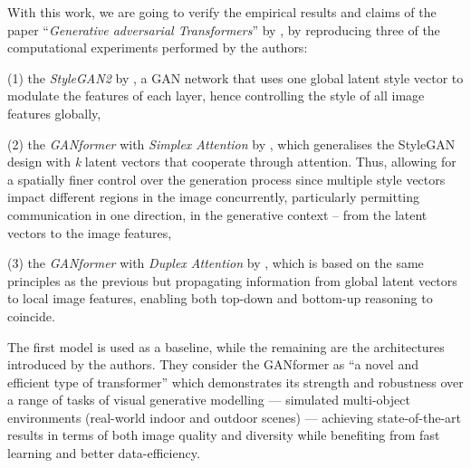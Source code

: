 \documentclass{article}
\begin{document}
With this work, we are going to verify the empirical results and claims of the paper 
``\emph{Generative adversarial Transformers}'' by \citet{hudson2021generative}, by reproducing 
three of the computational experiments performed by the authors:
\begin{enumerate*}
	\item[(1)] the \textit{StyleGAN2} by \citet{karras2020analyzing,karras2019style}, a GAN 
	network that uses one global latent style vector to modulate the features of each layer, hence 
	controlling the style of all image features globally,
	\item[(2)] the \textit{GANformer} with \textit{Simplex Attention} by 
	\citet{hudson2021generative}, which generalises the StyleGAN design with \textit{k} latent 
	vectors that cooperate through attention. Thus, allowing for a spatially finer control over the 
	generation 
	process since multiple style vectors impact different regions in the image concurrently, 
	particularly 
	permitting communication in one direction, in the generative context – from the latent vectors to 
	the 
	image features,
	\item[(3)] the \textit{GANformer} with \textit{Duplex Attention} by \citet{hudson2021generative}, 
	which is based on the same principles as the previous but propagating information from 
	global latent vectors to local image features, enabling both top-down and bottom-up reasoning to 
	coincide.
\end{enumerate*} 

The first model is used as a baseline, while the remaining are the architectures introduced by the 
authors. 
They consider the GANformer as “a novel and efficient type of transformer” which demonstrates its 
strength 
and robustness over a range of tasks of visual generative modelling — simulated multi-object 
environments 
(real-world indoor and outdoor scenes) — achieving state-of-the-art results in terms of both image 
quality 
and diversity while benefiting from fast learning and better data-efficiency.
\end{document}
